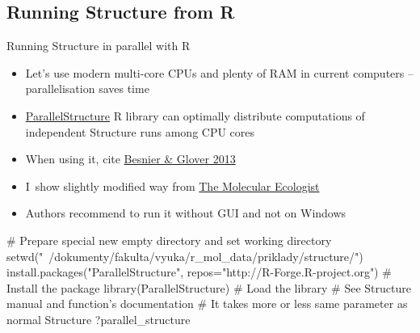 \documentclass[compress, ucs, xelatex, 11pt, xcolor=svgnames,
  hyperref={
    bookmarks=true,
    unicode=true,
    colorlinks=true,
    pdftitle={Molecular data in R},
    plainpages=false,
    pdfauthor={Vojtech Zeisek},
    pdfsubject={Course about phylogeny and evolution in R},
    pdfcreator={XeLaTeX},
    pdfkeywords={R, evolution, phylogeny, molecular data},
    linkcolor=Tomato,
    anchorcolor=SaddleBrown,
    citecolor=Goldenrod,
    filecolor=DarkMagenta,
    menucolor=Sienna,
    urlcolor=DarkTurquoise,
    pdftex},
  url={hyphens, lowtilde} %
  ]{beamer}
\begin{document}
\subsection{Running Structure from R}

\begin{frame}[fragile]{Running Structure in parallel with R}
\begin{itemize}
 \item Let's use modern multi-core CPUs and plenty of RAM in current computers -- parallelisation saves time
 \item \href{https://r-forge.r-project.org/R/?group_id=1636}{ParallelStructure} R library can optimally distribute computations of independent Structure runs among CPU cores
 \item When using it, cite \href{http://www.plosone.org/article/info\%3Adoi\%2F10.1371\%2Fjournal.pone.0070651}{Besnier \& Glover 2013}
 \item I~show slightly modified way from \href{http://www.molecularecologist.com/2013/09/using-r-to-run-parallel-analysis-of-population-genetic-data-in-structure-parallelstructure/}{The Molecular Ecologist}
 \item Authors recommend to run it without GUI and not on Windows
\end{itemize}
  \begin{spluscode}
    # Prepare special new empty directory and set working directory
    setwd("~/dokumenty/fakulta/vyuka/r_mol_data/priklady/structure/")
    install.packages("ParallelStructure",
      repos="http://R-Forge.R-project.org") # Install the package
    library(ParallelStructure) # Load the library
    # See Structure manual and function's documentation
    # It takes more or less same parameter as normal Structure
    ?parallel_structure
  \end{spluscode}
\end{frame}
\end{document}
